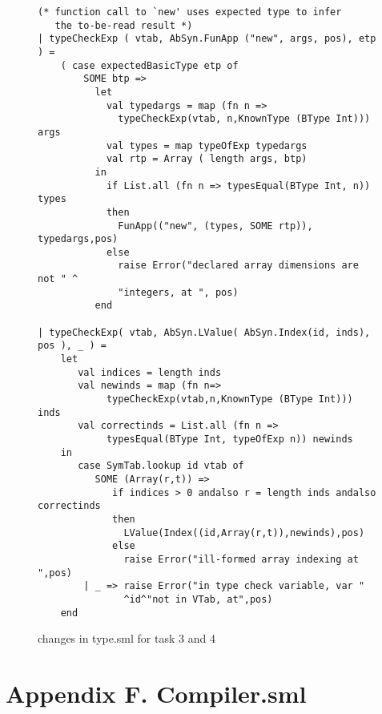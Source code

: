\documentclass[12pt,a4paper,english]{article}
\begin{document}
\begin{figure}[h]
\begin{lstlisting}
(* function call to `new' uses expected type to infer
   the to-be-read result *)
| typeCheckExp ( vtab, AbSyn.FunApp ("new", args, pos), etp ) =
    ( case expectedBasicType etp of
        SOME btp => 
          let 
            val typedargs = map (fn n => 
		      typeCheckExp(vtab, n,KnownType (BType Int))) args
            val types = map typeOfExp typedargs
            val rtp = Array ( length args, btp)
          in
            if List.all (fn n => typesEqual(BType Int, n)) types
            then 
              FunApp(("new", (types, SOME rtp)), typedargs,pos)
            else 
              raise Error("declared array dimensions are not " ^
			  "integers, at ", pos)
          end

| typeCheckExp( vtab, AbSyn.LValue( AbSyn.Index(id, inds), pos ), _ ) =
    let
       val indices = length inds
       val newinds = map (fn n=>
			typeCheckExp(vtab,n,KnownType (BType Int))) inds
       val correctinds = List.all (fn n => 
			typesEqual(BType Int, typeOfExp n)) newinds
    in
       case SymTab.lookup id vtab of
          SOME (Array(r,t)) => 
             if indices > 0 andalso r = length inds andalso correctinds 
             then
               LValue(Index((id,Array(r,t)),newinds),pos)
             else
               raise Error("ill-formed array indexing at ",pos)
        | _ => raise Error("in type check variable, var " 
			   ^id^"not in VTab, at",pos)
    end
\end{lstlisting}
\caption{changes in type.sml for task 3 and 4}\end{figure}

\newpage
\section{Appendix F. Compiler.sml}
\end{document}
